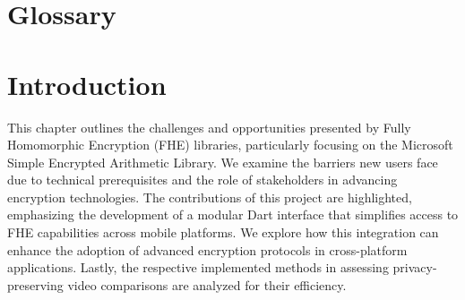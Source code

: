 \documentclass [11pt, proquest] {uwthesis}[2020/02/24]
\begin{document}
 
%
%

\prelimpages
 
%
%


\copyrightpage

\titlepage  

 
%
%

%
%


\setcounter{page}{-1}

 
%
%
\tableofcontents
\listoffigures
\listoftables
 
%
%
\chapter*{Glossary}      %
\thispagestyle{plain}
%

 
%
%

%

%
%

\textpages
 
 
\chapter {Introduction}

This chapter outlines the challenges and opportunities presented by Fully Homomorphic Encryption (FHE) libraries, particularly focusing on the Microsoft Simple Encrypted Arithmetic Library. We examine the barriers new users face due to technical prerequisites and the role of stakeholders in advancing encryption technologies. The contributions of this project are highlighted, emphasizing the development of a modular Dart interface that simplifies access to FHE capabilities across mobile platforms. We explore how this integration can enhance the adoption of advanced encryption protocols in cross-platform applications. Lastly, the respective implemented methods in assessing privacy-preserving video comparisons are analyzed for their efficiency.
\end{document}
